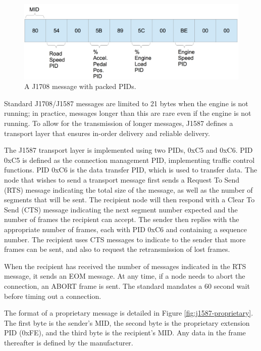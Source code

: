 \begin{figure}[h]
  \center
  \includegraphics[scale=0.6]{PackedPIDs}
  \caption{A J1708 message with packed PIDs.}
  \label{fig:packedpids}
\end{figure}


Standard J1708/J1587 messages are limited to 21 bytes when the engine is not running; in practice, messages longer than this are rare even if the engine
is not running. To allow for the transmission of longer messages, J1587 defines a transport layer that ensures in-order delivery and reliable delivery.

The J1587 transport layer is implemented using two PIDs, 0xC5 and 0xC6. PID 0xC5 is defined as the connection management PID, implementing traffic control
functions. PID 0xC6 is the data transfer PID, which is used to transfer data. The node that wishes to send a transport message first sends a Request To Send
(RTS) message indicating the total size of the message, as well as the number of segments that will be sent. The recipient node will then respond with a 
Clear To Send (CTS) message indicating the next segment number expected and the number of frames the recipient can accept. The sender then replies with
the appropriate number of frames, each with PID 0xC6 and containing a sequence number. The recipient uses CTS messages to indicate to the sender that
more frames can be sent, and also to request the retransmission of lost frames.

When the recipient has received the number of messages indicated in the RTS message, it sends an EOM message. At any time, if a node needs to abort the
connection, an ABORT frame is sent. The standard mandates a 60 second wait before timing out a connection.

The format of a proprietary message is detailed in Figure \ref{fig:j1587-proprietary}. The first byte is the sender's MID, the second byte is the
proprietary extension PID (0xFE), and the third byte is the recipient's MID. Any data in the frame thereafter is defined by the manufacturer.

